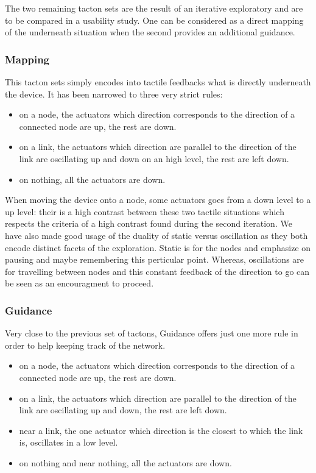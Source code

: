 The two remaining tacton sets are the result of an iterative exploratory
and are to be compared in a usability study. One can be considered as a
direct mapping of the underneath situation when the second provides an
additional guidance.

\subsubsection{Mapping}\label{mapping}

This tacton sets simply encodes into tactile feedbacks what is directly
underneath the device. It has been narrowed to three very strict rules:

\begin{itemize}
\item
  on a node, the actuators which direction corresponds to the direction
  of a connected node are up, the rest are down.
\item
  on a link, the actuators which direction are parallel to the direction
  of the link are oscillating up and down on an high level, the rest are
  left down.
\item
  on nothing, all the actuators are down.
\end{itemize}

When moving the device onto a node, some actuators goes from a down
level to a up level: their is a high contrast between these two tactile
situations which respects the criteria of a high contrast found during
the second iteration. We have also made good usage of the duality of
static versus oscillation as they both encode distinct facets of the
exploration. Static is for the nodes and emphasize on pausing and maybe
remembering this perticular point. Whereas, oscillations are for
travelling between nodes and this constant feedback of the direction to
go can be seen as an encouragment to proceed.

\subsubsection{Guidance}\label{guidance}

Very close to the previous set of tactons, Guidance offers just one more
rule in order to help keeping track of the network.

\begin{itemize}
\item
  on a node, the actuators which direction corresponds to the direction
  of a connected node are up, the rest are down.
\item
  on a link, the actuators which direction are parallel to the direction
  of the link are oscillating up and down, the rest are left down.
\item
  near a link, the one actuator which direction is the closest to which
  the link is, oscillates in a low level.
\item
  on nothing and near nothing, all the actuators are down.
\end{itemize}

